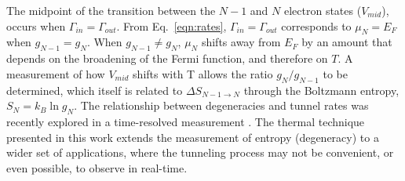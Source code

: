 \documentclass[twocolumn,showpacs,preprintnumbers,amsmath,amssymb,pra,aps,superscriptaddress]{revtex4-1}
\begin{document}
The midpoint of the transition between the $N-1$ and $N$ electron states ($V_{mid}$), occurs when $\Gamma_{in} = \Gamma_{out}$. From Eq.~\ref{eqn:rates}, $\Gamma_{in} = \Gamma_{out}$ corresponds to $\mu_{N} = E_F$ when $g_{N-1}=g_{N}$. When $g_{N-1}\neq g_{N}$, $\mu_{N}$ shifts away from $E_F$ by an amount that depends on the broadening of the Fermi function, and therefore on $T$.   A measurement of how $V_{mid}$ shifts with T allows the ratio $g_{N}/g_{N-1}$ to be determined, which itself is related to $\Delta S_{N-1\rightarrow N}$ through the Boltzmann entropy, $S_{N}=k_{B} \ln{g_N}$.  The relationship between degeneracies and tunnel rates was recently explored in a time-resolved measurement \cite{Hofmann2016}. The thermal technique presented in this work extends the measurement of entropy (degeneracy) to a wider set of applications, where the tunneling process may not be convenient, or even possible, to observe in real-time.

\end{document}
